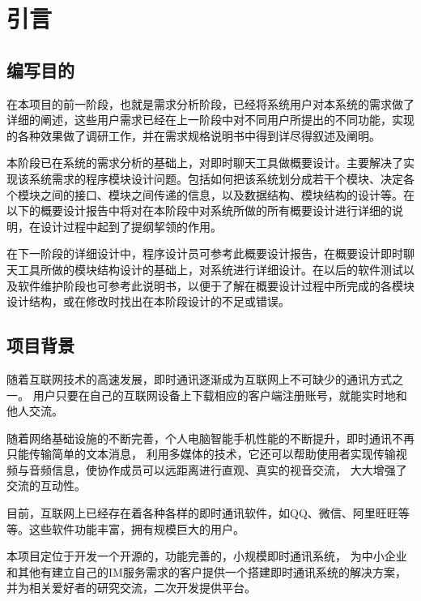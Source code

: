 \chapter{引言}
\section{编写目的}
在本项目的前一阶段，也就是需求分析阶段，已经将系统用户对本系统的需求做了详细的阐述，这些用户需求已经在上一阶段中对不同用户所提出的不同功能，实现的各种效果做了调研工作，并在需求规格说明书中得到详尽得叙述及阐明。

本阶段已在系统的需求分析的基础上，对即时聊天工具做概要设计。主要解决了实现该系统需求的程序模块设计问题。包括如何把该系统划分成若干个模块、决定各个模块之间的接口、模块之间传递的信息，以及数据结构、模块结构的设计等。在以下的概要设计报告中将对在本阶段中对系统所做的所有概要设计进行详细的说明，在设计过程中起到了提纲挈领的作用。

在下一阶段的详细设计中，程序设计员可参考此概要设计报告，在概要设计即时聊天工具所做的模块结构设计的基础上，对系统进行详细设计。在以后的软件测试以及软件维护阶段也可参考此说明书，以便于了解在概要设计过程中所完成的各模块设计结构，或在修改时找出在本阶段设计的不足或错误。


\section{项目背景}
随着互联网技术的高速发展，即时通讯逐渐成为互联网上不可缺少的通讯方式之一。
用户只要在自己的互联网设备上下载相应的客户端注册账号，就能实时地和他人交流。

随着网络基础设施的不断完善，个人电脑智能手机性能的不断提升，即时通讯不再只能传输简单的文本消息，
利用多媒体的技术，它还可以帮助使用者实现传输视频与音频信息，使协作成员可以远距离进行直观、真实的视音交流，
大大增强了交流的互动性。

目前，互联网上已经存在着各种各样的即时通讯软件，如QQ、微信、阿里旺旺等等。这些软件功能丰富，拥有规模巨大的用户。

本项目定位于开发一个开源的，功能完善的，小规模即时通讯系统，
为中小企业和其他有建立自己的IM服务需求的客户提供一个搭建即时通讯系统的解决方案，
并为相关爱好者的研究交流，二次开发提供平台。

